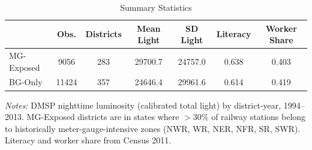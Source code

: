 \begin{table}[htbp]
\centering
\begin{threeparttable}
\caption{Summary Statistics}
\label{tab:summary}
\begin{tabular}{lcccccc}
\hline\hline
 & Obs. & Districts & Mean Light & SD Light & Literacy & Worker Share \\
\hline
MG-Exposed & 9056 & 283 & 29700.7 & 24757.0 & 0.638 & 0.403 \\
BG-Only & 11424 & 357 & 24646.4 & 29961.6 & 0.614 & 0.419 \\
\hline\hline
\end{tabular}
\begin{tablenotes}[flushleft]
\small
\item \textit{Notes:} DMSP nighttime luminosity (calibrated total light) by district-year, 1994--2013. MG-Exposed districts are in states where $>$30\% of railway stations belong to historically meter-gauge-intensive zones (NWR, WR, NER, NFR, SR, SWR). Literacy and worker share from Census 2011.
\end{tablenotes}
\end{threeparttable}
\end{table}

